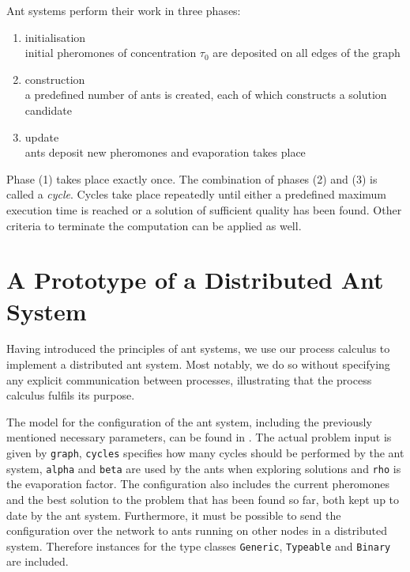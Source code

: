 \vspace*{-0.5em}

Ant systems perform their work in three phases:
\begin{enumerate}
  \item initialisation \\
    initial pheromones of concentration $\tau_0$ are deposited on all edges of the graph
  \vspace*{-0.5em}
  \item construction \\
    a predefined number of ants is created, each of which constructs a solution candidate \hspace*{-1em}
  \vspace*{-0.5em}
  \item update \\
    ants deposit new pheromones and evaporation takes place
\end{enumerate}
Phase (1) takes place exactly once. The combination of phases (2) and (3) is called a \textit{cycle}. Cycles take place repeatedly until either a predefined maximum execution time is reached or a solution of sufficient quality has been found. Other criteria to terminate the computation can be applied as well.

\section{A Prototype of a Distributed Ant System}
\label{chp:ant_system_implementation}
Having introduced the principles of ant systems, we use our process calculus to implement a distributed ant system. Most notably, we do so without specifying any explicit communication between processes, illustrating that the process calculus fulfils its purpose.

The model for the configuration of the ant system, including the previously mentioned necessary parameters, can be found in . The actual problem input is given by \texttt{graph}, \texttt{cycles} specifies how many cycles should be performed by the ant system, \texttt{alpha} and \texttt{beta} are used by the ants when exploring solutions and \texttt{rho} is the evaporation factor. The configuration also includes the current pheromones and the best solution to the problem that has been found so far, both kept up to date by the ant system. Furthermore, it must be possible to send the configuration over the network to ants running on other nodes in a distributed system. Therefore instances for the type classes \texttt{Generic}, \texttt{Typeable} and \texttt{Binary} are included.

